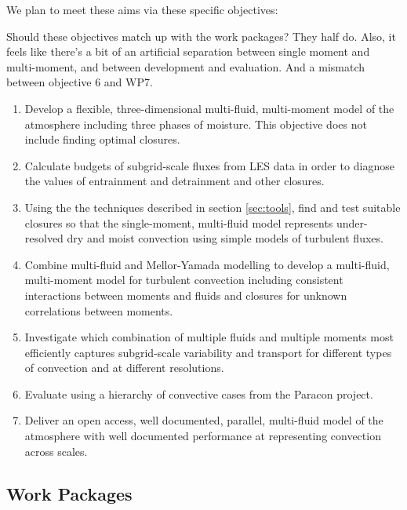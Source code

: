 \documentclass[11pt,a4paper]{article}
\begin{document}
We plan to meet these aims via these specific objectives:

{\color{red} Should these objectives match up with the work packages? They half do. Also, it feels like there's a
bit of an artificial separation between single moment and multi-moment, and between development and evaluation.
And a mismatch between objective 6 and WP7.}

\begin{enumerate}
\item\label{it:model} Develop a flexible, three-dimensional multi-fluid, multi-moment model of the atmosphere including three phases of moisture. This objective does not include finding optimal closures.

\item\label{it:budgets} Calculate budgets of subgrid-scale fluxes from LES data in order to diagnose the values of entrainment and detrainment and other closures.

\item Using the the techniques described in section \ref{sec:tools}, find and test suitable closures so that the single-moment, multi-fluid model represents under-resolved dry and moist convection using simple models of turbulent fluxes.

\item Combine multi-fluid and Mellor-Yamada modelling to develop a  multi-fluid, multi-moment model for turbulent convection including consistent interactions between moments and fluids and closures for unknown correlations between moments.

\item Investigate which combination of multiple fluids and multiple moments most efficiently captures subgrid-scale
variability and transport for different types of convection and at different resolutions.

\item Evaluate using a hierarchy of convective cases from the Paracon project.

\item Deliver an open access, well documented, parallel, multi-fluid model of the atmosphere with well documented performance at representing convection across scales.
\end{enumerate}

\subsection{Work Packages}
\label{sec:WPs}
\end{document}
